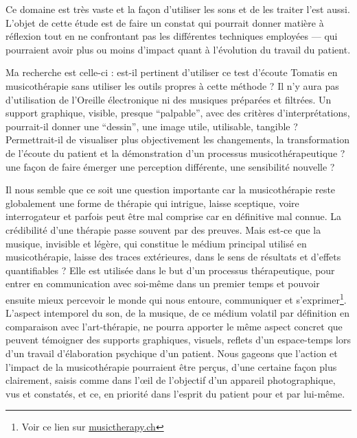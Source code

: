 Ce domaine est très vaste et la façon d'utiliser les sons et de les
traiter l'est aussi. L'objet de cette étude est de faire un constat
qui pourrait donner matière à réflexion tout en ne confrontant pas les
différentes techniques employées --- qui pourraient avoir plus ou %
moins d'impact quant à l'évolution du travail du patient.

Ma recherche est celle-ci : est-il pertinent d'utiliser ce test
d'écoute Tomatis en musicothérapie sans utiliser les outils propres à
cette méthode ? Il n'y aura pas d'utilisation de l'Oreille
électronique ni des musiques préparées et filtrées.  Un support
graphique, visible, presque ``palpable'', avec des critères
d'interprétations, pourrait-il donner une ``dessin'', une image utile,
utilisable, tangible ? Permettrait-il de visualiser plus objectivement
les changements, la transformation de l'écoute du patient et la
démonstration d'un processus musicothérapeutique ? %
une façon de faire émerger  %
une perception différente, une sensibilité
nouvelle ?

  Il nous semble que ce soit une
question importante car la musicothérapie reste globalement une forme de thérapie qui intrigue, laisse sceptique, voire  interrogateur et parfois peut être mal comprise car
en définitive mal connue. %
La crédibilité d'une thérapie
passe souvent par des preuves. Mais est-ce que la musique, invisible
et légère, qui constitue le médium principal utilisé en musicothérapie, laisse
des traces extérieures, dans le sens de résultats et d'effets quantifiables ?
Elle est utilisée dans le but d'un processus
thérapeutique, pour entrer en communication avec soi-même dans un
premier temps et pouvoir ensuite mieux percevoir le monde qui nous
entoure, communiquer et s'exprimer\footnote{%
Voir ce lien sur \href{http://www.musictherapy.ch/fr/musicotherapie/quest-ce-que-la-musicotherapie/}{musictherapy.ch}}.
L'aspect intemporel du son, de la musique, de ce médium volatil par
définition en comparaison avec l'art-thérapie, ne pourra apporter le
même aspect concret que peuvent témoigner des supports graphiques,
visuels, reflets d'un espace-temps lors d'un travail d'élaboration
psychique d'un patient.  Nous gageons que l'action et l'impact de la
musicothérapie pourraient être perçus, d'une certaine façon plus
clairement, saisis comme dans l'\oe il de l'objectif d'un appareil
photographique, vus et constatés, et ce, en priorité dans l'esprit du
patient pour et par lui-même.

